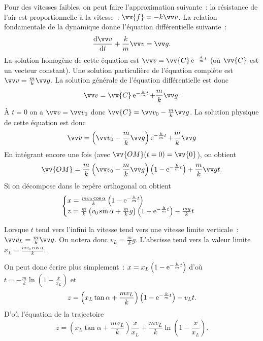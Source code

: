 Pour des vitesses faibles, on peut faire l'approximation suivante~: la résistance de l'air est proportionnelle à la vitesse~: $\vv{f}=-k \vvv$. La relation fondamentale de la dynamique donne l'équation différentielle suivante~:
\begin{equation}
  \derived{\vvv}{t}+\frac{k}{m}\vvv = \vg.
\end{equation}
La solution homogène de cette équation est $\vvv = \vv{C}\e^{-\frac{k}{m}t}$ (où $\vv{C}$ est un vecteur constant). Une solution particulière de l'équation complète est $\vvv = \frac{m}{k}\vg$. La solution générale de l'équation différentielle est donc
\begin{equation}
  \vvv = \vv{C}\e^{-\frac{k}{m}t} + \frac{m}{k}\vg.
\end{equation}
À $t=0$ on a $\vvv=\vvv_0$ donc $\vv{C}=\vvv_0 - \frac{m}{k}\vg$. La solution physique de cette équation est donc
\begin{equation}
  \vvv = \left( \vvv_0 - \frac{m}{k}\vg \right) \e^{-\frac{k}{m}t} + \frac{m}{k}\vg
\end{equation}
En intégrant encore une fois (avec $\vv{OM}(t=0)=\vv{0}$), on obtient
\begin{equation}
  \vv{OM} = \frac{m}{k}\left(\vvv_0 - \frac{m}{k}\vg\right)\left(1 - \e^{-\frac{k}{m}t}\right) + \frac{m}{k}\vg t.
\end{equation}
Si on décompose dans le repère orthogonal on obtient
\begin{equation}
  \begin{cases}
    x = \frac{m v_0 \cos\alpha}{k}\left(1 - \operatorname{e}^{-\frac{k}{m}t}\right) \\
    z = \frac{m}{k}\left(v_0\sin\alpha + \frac{m}{k}g\right) \left(1 - \operatorname{e}^{-\frac{k}{m}t}\right) - \frac{mg}{k}t
  \end{cases}
\end{equation}

Lorsque $t$ tend vers l'infini la vitesse tend vers une vitesse limite verticale~: $\vvv_L = \frac{m}{k}\vg$. On notera donc $v_L = \frac{m}{k}g$. L'abscisse tend vers la valeur limite $x_L = \frac{mv_0 \cos \alpha}{k}$.

On peut donc écrire plus simplement~: $x = x_L\left(1-\operatorname{e}^{-\frac{k}{m}t}\right)$ d'où $t = -\frac{m}{k}\ln\left(1-\frac{x}{x_L}\right)$ et
\begin{equation}
  z = \left(x_L\tan \alpha + \frac{mv_L}{k}\right)\left(1-\operatorname{e}^{-\frac{k}{m}t}\right) -v_L t.
\end{equation}
D'où l'équation de la trajectoire
\begin{equation}
  z = \left(x_L\tan \alpha + \frac{mv_L}{k}\right)\frac{x}{x_L} + \frac{m v_L}{k}\ln\left(1-\frac{x}{x_L}\right).
\end{equation}

